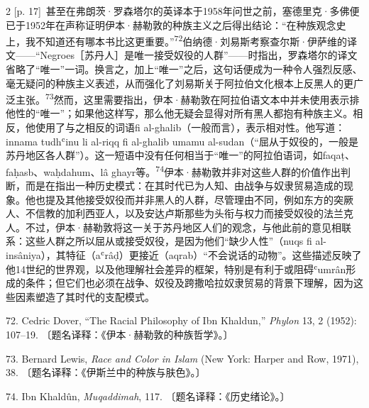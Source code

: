 \documentclass[10pt,a4paper]{article}
\begin{document}
\begin{paracol}{2}
{\scriptsize\color{gray} [p. 17]}\ 甚至在弗朗茨·罗森塔尔的英译本于1958年问世之前，塞德里克·多佛便已于1952年在声称证明伊本·赫勒敦的种族主义之后得出结论：“在种族观念史上，我不知道还有哪本书比这更重要。”\nobreak\textsuperscript{72}伯纳德·刘易斯考察查尔斯·伊萨维的译文——“Negroes［苏丹人］是唯一接受奴役的人群”——时指出，罗森塔尔的译文省略了“唯一”一词。换言之，加上“唯一”之后，这句话便成为一种令人强烈反感、毫无疑问的种族主义表述，从而强化了刘易斯关于阿拉伯文化根本上反黑人的更广泛主\mbox{张。\textsuperscript{73}}然而，这里需要指出，伊本·赫勒敦在阿拉伯语文本中并未使用表示排他性的“唯一”；如果他这样写，那么他无疑会显得对所有黑人都抱有种族主义。相反，他使用了与之相反的词语fi al-ghalib（一般而言），表示相对性。他写道：innama tudhʿinu li al-riqq fi al-ghalib umamu al-sudan（“屈从于奴役的，一般是苏丹地区各人群”）。这一短语中没有任何相当于“唯一”的阿拉伯语词，如faqaṭ、faḥasb、waḥdahum、lâ ghayr\mbox{等。\textsuperscript{74}}伊本·赫勒敦并非对这些人群的价值作出判断，而是在指出一种历史模式：在其时代已为人知、由战争与奴隶贸易造成的现象。他也提及其他接受奴役而并非黑人的人群，尽管理由不同，例如东方的突厥人、不信教的加利西亚人，以及安达卢斯那些为头衔与权力而接受奴役的法兰克人。不过，伊本·赫勒敦将这一关于苏丹地区人们的观念，与他此前的意见相联系：这些人群之所以屈从或接受奴役，是因为他们“缺少人性”（nuqs fi al-insâniya），其特征（aʿrâḍ）更接近（aqrab）“不会说话的动物”。这些描述反映了他14世纪的世界观，以及他理解社会差异的框架，特别是有利于或阻碍ʿumrân形成的条件；但它们也必须在战争、奴役及跨撒哈拉奴隶贸易的背景下理解，因为这些因素塑造了其时代的支配模式。\par{\small 72. Cedric Dover, “The Racial Philosophy of Ibn Khaldun,” \textit{Phylon} 13, 2 (1952): 107–19. 〔题名译释：《伊本·赫勒敦的种族哲学》。〕\par}{\small 73. Bernard Lewis, \textit{Race and Color in Islam} (New York: Harper and Row, 1971), 38. 〔题名译释：《伊斯兰中的种族与肤色》。〕\par}{\small 74. Ibn Khaldûn, \textit{Muqaddimah}, 117. 〔题名译释：《历史绪论》。〕\par}
\switchcolumn

\end{paracol}
\end{document}

